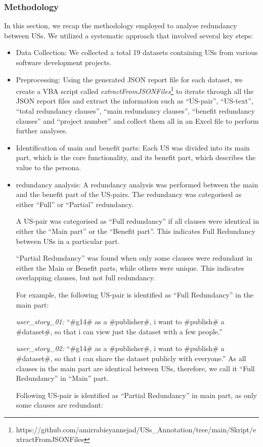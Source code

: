 \subsubsection*{Methodology}
In this section, we recap the methodology employed to analyse redundancy between USs. We utilized a systematic approach that involved several key steps:
\begin{itemize}
	\item Data Collection: We collected a total 19 datasets containing USs from various software development projects.
	\item Preprocessing: Using the generated JSON report file for each dataset, we create a VBA script called \textit{extractFromJSONFiles}\footnote{https://github.com/amirrabieyannejad/USs\_Annotation/tree/main/Skript/extractFromJSONFiles} to iterate through all the JSON report files and extract the information such as \enquote{US-pair}, \enquote{US-text}, \enquote{total redundancy clauses}, \enquote{main redundancy clauses}, \enquote{benefit redundancy clauses} and \enquote{project number} and collect them all in an Excel file to perform further analyses.
	\item Identification of main and benefit parts: Each US was divided into its main part, which is the core functionality, and its benefit part, which describes the value to the persona.
	\item redundancy analysis: A redundancy analysis was performed between the main and the benefit part of the US-pairs. The redundancy was categorised as either \enquote{Full} or \enquote{Partial} redundancy.
	
	A US-pair was categorised as \enquote{Full redundancy} if all clauses were identical in either the \enquote{Main part} or the \enquote{Benefit part}. This indicates Full Redundancy between USs in a particular part.
	
	\enquote{Partial Redundancy} was found when only some clauses were redundant in either the Main or Benefit parts, while others were unique. This indicates overlapping clauses, but not full redundancy.
	
	\begin{example}
		For example, the following US-pair is identified as \enquote{Full Redundancy} in the main part:
		
		\textit{user\_story\_01:} \enquote{\#g14\# as a \#publisher\#, i want to \#publish\# a \#dataset\#, so that i can view just the dataset with a few people.}
		
		\textit{user\_story\_02:} \enquote{\#g14\# as a \#publisher\#, i want to \#publish\# a \#dataset\#, so that i can share the dataset publicly with everyone.}	
		 As all clauses in the main part are identical between USs, therefore, we call it \enquote{Full Redundancy} in \enquote{Main} part.
	\end{example}
	\begin{example}
		Following US-pair is identified as \enquote{Partial Redundancy} in main part, as only some clauses are redundant:
		

\end{example}
\end{itemize}

